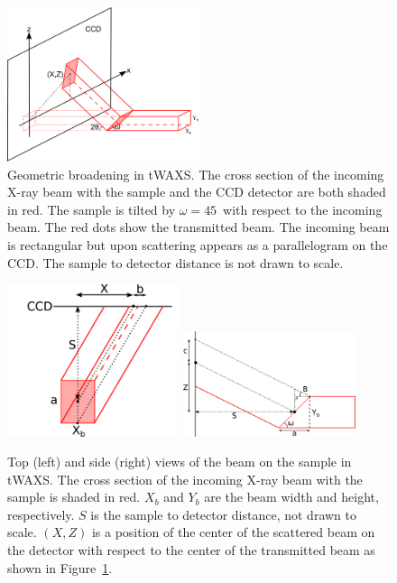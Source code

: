 \begin{figure}[htbp]
  \centering
  \includegraphics[width=0.5\textwidth]{figures/ripple/MMs/transmission/geometric_broadening1}
  \caption[Geometric broadening in tWAXS]
  {Geometric broadening in tWAXS. 
  The cross section of the incoming X-ray beam with the sample and the CCD 
  detector are both shaded in red. The sample is tilted by $\omega=45$\textdegree\
  with respect to the incoming beam.
  The red dots show the transmitted beam. The incoming beam is rectangular
  but upon scattering appears as a parallelogram on the CCD.
  The sample to detector distance is not drawn to scale.}
  \label{fig:gb_trans1}
\end{figure}

\begin{figure}[htbp]
  \centering
  \includegraphics[width=0.45\textwidth]{figures/ripple/MMs/transmission/geometric_broadening2}
  \includegraphics[width=0.45\textwidth]{figures/ripple/MMs/transmission/geometric_broadening3}
  \caption[Top (left) and side (right) views of the beam on the sample in tWAXS]
  {Top (left) and side (right) views of the beam on the sample in tWAXS. 
  The cross section of the incoming X-ray 
  beam with the sample is shaded in red. 
  $X_b$ and $Y_b$ are the beam width and height, respectively. 
  $S$ is the sample to detector distance, not drawn to scale. 
  $(X,Z)$ is a  
	position of the center of the scattered beam on the detector with respect 
	to the center of the transmitted beam as shown in 
	Figure~\ref{fig:gb_trans1}.}
  \label{fig:gb_trans2}
\end{figure}

